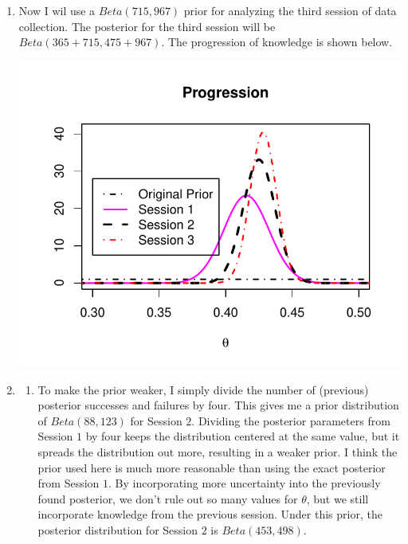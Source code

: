 \documentclass[11pt]{article}\usepackage[]{graphicx}\usepackage[]{color}
\newenvironment{knitrout}{}{} %
\begin{document}
\begin{doublespacing}
\begin{enumerate}
\begin{enumerate}
\item Now I wil use a $Beta(715, 967)$ prior for analyzing the third session of data collection. The posterior for the third session will be $Beta(365+715, 475+967)$. The progression of knowledge is shown below.

\begin{center}
\begin{knitrout}\footnotesize
{}\color{fgcolor}
\includegraphics[width=0.8\linewidth]{figure/progress-1} 

\end{knitrout}
\end{center}

\item \begin{enumerate}

\item To make the prior weaker, I simply divide the number of (previous) posterior successes and failures by four. This gives me a prior distribution of $Beta(88, 123)$ for Session $2$. Dividing the posterior parameters from Session $1$ by four keeps the distribution centered at the same value, but it spreads the distribution out more, resulting in a weaker prior. I think the prior used here is much more reasonable than using the exact posterior from Session $1$. By incorporating more uncertainty into the previously found posterior, we don't rule out so many values for $\theta$, but we still incorporate knowledge from the previous session. Under this prior, the posterior distribution for Session $2$ is $Beta(453, 498)$.


\end{enumerate}
\end{enumerate}
\end{enumerate}
\end{doublespacing}
\end{document}
